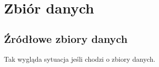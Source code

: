 \chapter{Zbiór danych}

\section{Źródłowe zbiory danych}
Tak wygląda sytuacja jeśli chodzi o zbiory danych.
